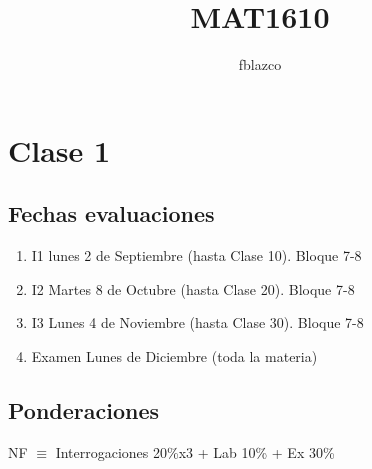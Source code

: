 \documentclass{article}
\author{fblazco}
\title{MAT1610}
\begin{document}
	\maketitle
    \section{Clase 1}
        \subsection{Fechas evaluaciones}
            \begin{enumerate}
                \item  I1 lunes 2 de Septiembre (hasta Clase 10). Bloque 7-8
                \item  I2 Martes 8 de Octubre  (hasta Clase 20). Bloque 7-8
                \item  I3 Lunes 4 de Noviembre (hasta Clase 30). Bloque 7-8
                \item  Examen Lunes de Diciembre (toda la materia)
            \end{enumerate}
        \subsection{Ponderaciones}
            \begin{center}
                NF $\equiv$ Interrogaciones 20\%x3 + Lab 10\% + Ex 30\% 
            \end{center}
\end{document}
